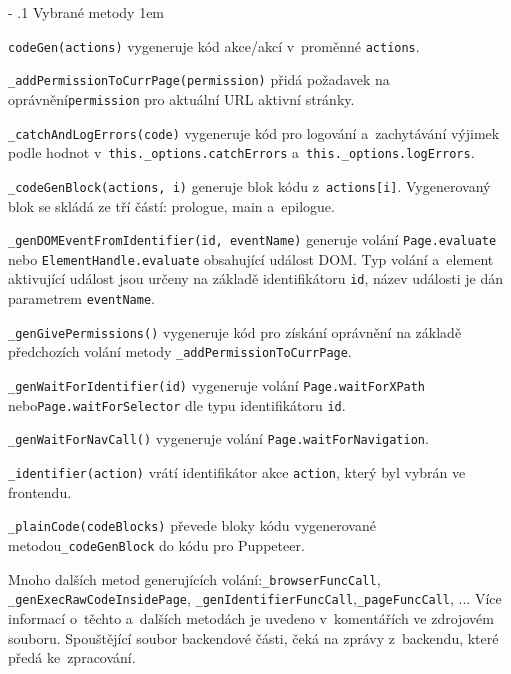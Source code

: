 \documentclass[12pt, a4paper, twoside]{article}
\makeatletter
\newcommand\subsubsubsection{\@startsection{paragraph}{4}{\z@}{-2.5ex\@plus -1ex \@minus -.25ex}{1.25ex \@plus .25ex}{\normalfont\normalsize\bfseries}}
\newenvironment{methods}{
	\parindent0pt
	\parskip1em
	\vspace{-0.8em}
}{}
\renewcommand\paragraph{%
	\@startsection{subparagraph}{5}{0mm}%
	{-\baselineskip}%
	{.1\baselineskip}%
	{\normalfont\normalsize\bfseries}}
\makeatother
\begin{document}
	\paragraph{Vybrané metody}
	\begin{methods}
		\lstinline|codeGen(actions)| vygeneruje kód akce/akcí v~proměnné \lstinline|actions|.
		
		\lstinline|_addPermissionToCurrPage(permission)| přidá požadavek na oprávnění\newline\lstinline|permission| pro aktuální URL aktivní stránky.
		
		\lstinline|_catchAndLogErrors(code)| vygeneruje kód pro logování a~zachytávání výjimek podle hodnot v~\lstinline|this._options.catchErrors| a~\lstinline|this._options.logErrors|.
		
		\lstinline|_codeGenBlock(actions, i)| generuje blok kódu z~\lstinline|actions[i]|. Vygenerovaný blok se skládá ze tří částí: prologue, main a~epilogue.
		
		\lstinline|_genDOMEventFromIdentifier(id, eventName)| generuje volání \lstinline|Page.evaluate| nebo \lstinline|ElementHandle.evaluate| obsahující událost DOM. Typ volání a~element aktivující událost jsou určeny na základě identifikátoru \lstinline|id|, název události je dán parametrem \lstinline|eventName|.
		
		\lstinline|_genGivePermissions()| vygeneruje kód pro získání oprávnění na základě předchozích volání metody \lstinline|_addPermissionToCurrPage|.
		
		\lstinline|_genWaitForIdentifier(id)| vygeneruje volání \lstinline|Page.waitForXPath| nebo\newline\lstinline|Page.waitForSelector| dle typu identifikátoru \lstinline|id|.
		
		\lstinline|_genWaitForNavCall()| vygeneruje volání \lstinline|Page.waitForNavigation|.
		
		\lstinline|_identifier(action)| vrátí identifikátor akce \lstinline|action|, který byl vybrán ve frontendu.
		
		\lstinline|_plainCode(codeBlocks)| převede bloky kódu vygenerované metodou\newline\lstinline|_codeGenBlock| do kódu pro Puppeteer.
		
		Mnoho dalších metod generujících volání:\newline \lstinline|_browserFuncCall|, \lstinline|_genExecRawCodeInsidePage|, \lstinline|_genIdentifierFuncCall|,\linebreak\lstinline|_pageFuncCall|, ... Více informací o~těchto a~dalších metodách je uvedeno v~komentářích ve zdrojovém souboru.
	\end{methods}
	\subsubsubsection{main.js}
	Spouštějící soubor backendové části, čeká na zprávy z~backendu, které předá ke~zpracování.
\end{document}
